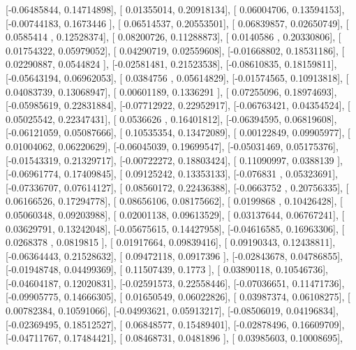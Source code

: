 \documentclass{article}
\begin{document}
       [-0.06485844,  0.14714898],
       [ 0.01355014,  0.20918134],
       [ 0.06004706,  0.13594153],
       [-0.00744183,  0.1673446 ],
       [ 0.06514537,  0.20553501],
       [ 0.06839857,  0.02650749],
       [ 0.0585414 ,  0.12528374],
       [ 0.08200726,  0.11288873],
       [ 0.0140586 ,  0.20330806],
       [ 0.01754322,  0.05979052],
       [ 0.04290719,  0.02559608],
       [-0.01668802,  0.18531186],
       [ 0.02290887,  0.0544824 ],
       [-0.02581481,  0.21523538],
       [-0.08610835,  0.18159811],
       [-0.05643194,  0.06962053],
       [ 0.0384756 ,  0.05614829],
       [-0.01574565,  0.10913818],
       [ 0.04083739,  0.13068947],
       [ 0.00601189,  0.1336291 ],
       [ 0.07255096,  0.18974693],
       [-0.05985619,  0.22831884],
       [-0.07712922,  0.22952917],
       [-0.06763421,  0.04354524],
       [ 0.05025542,  0.22347431],
       [ 0.0536626 ,  0.16401812],
       [-0.06394595,  0.06819608],
       [-0.06121059,  0.05087666],
       [ 0.10535354,  0.13472089],
       [ 0.00122849,  0.09905977],
       [ 0.01004062,  0.06220629],
       [-0.06045039,  0.19699547],
       [-0.05031469,  0.05175376],
       [-0.01543319,  0.21329717],
       [-0.00722272,  0.18803424],
       [ 0.11090997,  0.0388139 ],
       [-0.06961774,  0.17409845],
       [ 0.09125242,  0.13353133],
       [-0.076831  ,  0.05323691],
       [-0.07336707,  0.07614127],
       [ 0.08560172,  0.22436388],
       [-0.0663752 ,  0.20756335],
       [ 0.06166526,  0.17294778],
       [ 0.08656106,  0.08175662],
       [ 0.0199868 ,  0.10426428],
       [ 0.05060348,  0.09203988],
       [ 0.02001138,  0.09613529],
       [ 0.03137644,  0.06767241],
       [ 0.03629791,  0.13242048],
       [-0.05675615,  0.14427958],
       [-0.04616585,  0.16963306],
       [ 0.0268378 ,  0.0819815 ],
       [ 0.01917664,  0.09839416],
       [ 0.09190343,  0.12438811],
       [-0.06364443,  0.21528632],
       [ 0.09472118,  0.0917396 ],
       [-0.02843678,  0.04786855],
       [-0.01948748,  0.04499369],
       [ 0.11507439,  0.1773    ],
       [ 0.03890118,  0.10546736],
       [-0.04604187,  0.12020831],
       [-0.02591573,  0.22558446],
       [-0.07036651,  0.11471736],
       [-0.09905775,  0.14666305],
       [ 0.01650549,  0.06022826],
       [ 0.03987374,  0.06108275],
       [ 0.00782384,  0.10591066],
       [-0.04993621,  0.05913217],
       [-0.08506019,  0.04196834],
       [-0.02369495,  0.18512527],
       [ 0.06848577,  0.15489401],
       [-0.02878496,  0.16609709],
       [-0.04711767,  0.17484421],
       [ 0.08468731,  0.0481896 ],
       [ 0.03985603,  0.10008695],
\end{document}
